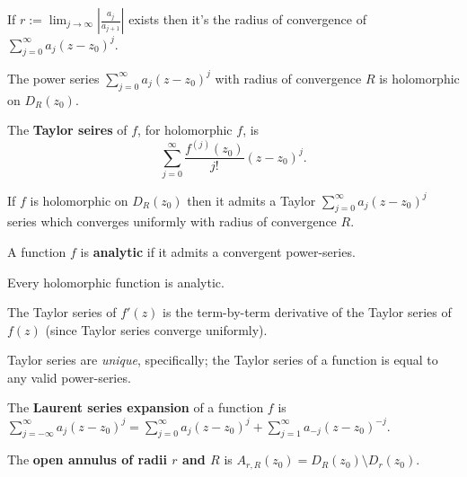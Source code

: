 \begin{multicols}{2}
\begin{theorem}[4.2.4]
If $r:=\lim_{j\to\infty}\left|\frac{a_j}{a_{j+1}}\right|$ exists then it's the radius of convergence of $\sum_{j=0}^\infty a_j(z-z_0)^j$.
\end{theorem}

\begin{theorem}[4.2.6]
The power series $\sum_{j=0}^\infty a_j(z-z_0)^j$ with radius of convergence $R$ is holomorphic on $D_R(z_0)$.
\end{theorem}

\begin{definition}
The \textbf{Taylor seires} of $f$, for holomorphic $f$, is
    \[
    \sum_{j=0}^\infty \frac{f^{(j)}(z_0)}{j!}(z-z_0)^j.
    \]
\end{definition}

\begin{theorem}[4.3.2]
If $f$ is holomorphic on $D_R(z_0)$ then it admits a Taylor $\sum_{j=0}^\infty a_j(z-z_0)^j$ series which converges uniformly with radius of convergence $R$.
\end{theorem}

\begin{definition}
A function $f$ is \textbf{analytic} if it admits a convergent power-series.
\end{definition}

\begin{theorem}[4.3.5]
Every holomorphic function is analytic.
\end{theorem}

\begin{theorem}[4.3.9]
The Taylor series of $f'(z)$ is the term-by-term derivative of the Taylor series of $f(z)$ (since Taylor series converge uniformly). 
\end{theorem}

\begin{theorem}[4.3.12]
Taylor series are \textit{unique}, specifically; the Taylor series of a function is equal to any valid power-series.
\end{theorem}

\begin{definition}
The \textbf{Laurent series expansion} of a function $f$ is $\sum_{j=-\infty}^\infty a_j(z-z_0)^j = \sum_{j=0}^\infty a_j(z-z_0)^j + \sum_{j=1}^\infty a_{-j}(z-z_0)^{-j}$.
\end{definition}

\begin{definition}
The \textbf{open annulus of radii $r$ and $R$} is $A_{r,R}(z_0)=D_R(z_0)\setminus D_r(z_0)$. 
\end{definition}


\end{multicols}
